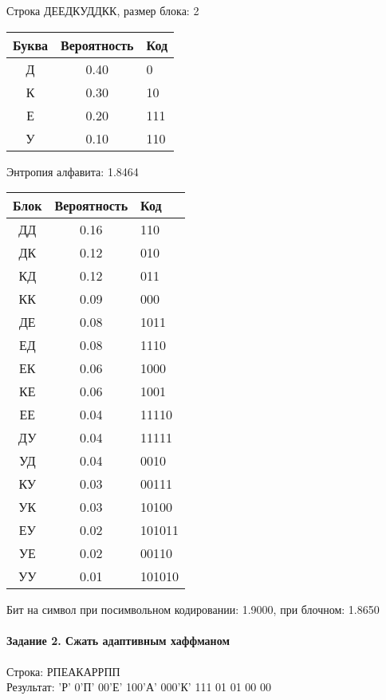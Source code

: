 \documentclass[a4paper, 12pt]{article}
\begin{document}
Строка ДЕЕДКУДДКК, размер блока: 2
\begin{center}
 \begin{tabular}{ |c|c|l| } 
  \hline
     Буква & Вероятность & Код\\ \hline
Д & 0.40 & 0\\\hline
К & 0.30 & 10\\\hline
Е & 0.20 & 111\\\hline
У & 0.10 & 110
\\ \hline \end{tabular}
\end{center}
Энтропия алфавита: 1.8464
\begin{center}
 \begin{tabular}{ |c|c|l| } 
  \hline
     Блок & Вероятность & Код\\ \hline
ДД & 0.16 & 110\\\hline
ДК & 0.12 & 010\\\hline
КД & 0.12 & 011\\\hline
КК & 0.09 & 000\\\hline
ДЕ & 0.08 & 1011\\\hline
ЕД & 0.08 & 1110\\\hline
ЕК & 0.06 & 1000\\\hline
КЕ & 0.06 & 1001\\\hline
ЕЕ & 0.04 & 11110\\\hline
ДУ & 0.04 & 11111\\\hline
УД & 0.04 & 0010\\\hline
КУ & 0.03 & 00111\\\hline
УК & 0.03 & 10100\\\hline
ЕУ & 0.02 & 101011\\\hline
УЕ & 0.02 & 00110\\\hline
УУ & 0.01 & 101010
\\ \hline \end{tabular}
\end{center}
Бит на символ при посимвольном кодировании: 1.9000, при блочном: 1.8650


\pagebreak
\paragraph{Задание 2. Сжать адаптивным хаффманом\\}

Строка: 
РПЕАКАРРПП\\
Результат: 'Р' 0'П' 00'Е' 100'А' 000'К' 111 01 01 00 00
\end{document}
